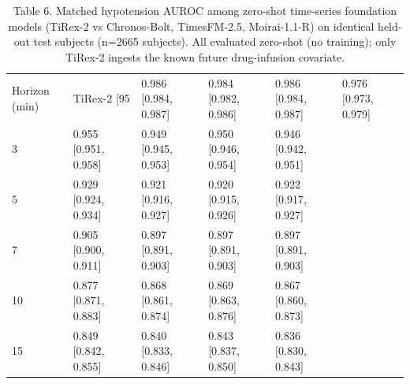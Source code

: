 \begin{table}[t]\centering\footnotesize
\caption{Table 6. Matched hypotension AUROC among zero-shot time-series foundation models (TiRex-2 vs Chronos-Bolt, TimesFM-2.5, Moirai-1.1-R) on identical held-out test subjects (n=2665 subjects). All evaluated zero-shot (no training); only TiRex-2 ingests the known future drug-infusion covariate.}
\begin{tabular}{lllll}
\toprule
Horizon (min) & TiRex-2 [95%
 & 0.986 [0.984, 0.987] & 0.984 [0.982, 0.986] & 0.986 [0.984, 0.987] & 0.976 [0.973, 0.979] \\
3 & 0.955 [0.951, 0.958] & 0.949 [0.945, 0.953] & 0.950 [0.946, 0.954] & 0.946 [0.942, 0.951] \\
5 & 0.929 [0.924, 0.934] & 0.921 [0.916, 0.927] & 0.920 [0.915, 0.926] & 0.922 [0.917, 0.927] \\
7 & 0.905 [0.900, 0.911] & 0.897 [0.891, 0.903] & 0.897 [0.891, 0.903] & 0.897 [0.891, 0.903] \\
10 & 0.877 [0.871, 0.883] & 0.868 [0.861, 0.874] & 0.869 [0.863, 0.876] & 0.867 [0.860, 0.873] \\
15 & 0.849 [0.842, 0.855] & 0.840 [0.833, 0.846] & 0.843 [0.837, 0.850] & 0.836 [0.830, 0.843] \\
\bottomrule
\end{tabular}
\end{table}
